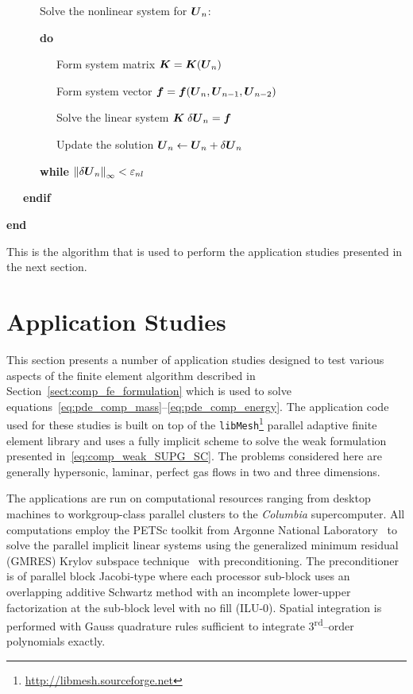 \begin{algorithm}[!htb]
\begin{minipage}{.95\textwidth}
\begin{list}{:\ \ }{}
	\item \ \ \ \ \ \ Solve the nonlinear system for $\bv{U}_n$:
 	\item \ \ \ \ \ \ \textbf{do}
 	\item \ \ \ \ \ \ \ \ \ Form system matrix $\bt{K} = \bt{K}(\bv{U}_n)$
 	\item \ \ \ \ \ \ \ \ \ Form system vector $\bv{f}= \bv{f}(\bv{U}_n,\bv{U}_{n-1},\bv{U}_{n-2})$
 	\item \ \ \ \ \ \ \ \ \ Solve the linear system $\bt{K} \; \delta\bv{U}_n = \bv{f}$
	\item \ \ \ \ \ \ \ \ \ Update the solution $\bv{U}_n \leftarrow \bv{U}_n + \delta\bv{U}_n$
 	\item \ \ \ \ \ \ \textbf{while} $\norm[\infty]{\delta\bv{U}_n} < \varepsilon_{nl}$
        \item \ \ \ \textbf{endif}
        \item \textbf{end} \\
    \end{list}
  \end{minipage}
\end{algorithm}
This is the algorithm that is used to perform the application studies presented in the next section.

\clearpage
\section{Application Studies\label{chap:compressible:applications}}
This section presents a number of application studies designed to test various aspects of the finite element algorithm described in Section~\ref{sect:comp_fe_formulation} which is used to solve equations~\eqref{eq:pde_comp_mass}--\eqref{eq:pde_comp_energy}.  The application code used for these studies is built on top of the \texttt{libMesh}\footnote{\url{http://libmesh.sourceforge.net}} parallel adaptive finite element library and uses a fully implicit scheme to solve the weak formulation presented in~\eqref{eq:comp_weak_SUPG_SC}.  The problems considered here are generally hypersonic, laminar, perfect gas flows in two and three dimensions.

The applications are run on computational resources ranging from desktop machines to workgroup-class parallel clusters to the \emph{Columbia} supercomputer.  All computations employ the PETSc toolkit from Argonne National Laboratory~\cite{petsc_manual} to solve the parallel implicit linear systems using the generalized minimum residual (GMRES) Krylov subspace technique~\cite{saad_schultz_gmres} with preconditioning.  The preconditioner is of parallel block Jacobi-type where each processor sub-block uses an overlapping additive Schwartz method with an incomplete lower-upper factorization at the sub-block level with no fill (ILU-0).  Spatial integration is performed with Gauss quadrature rules sufficient to integrate 3\textsuperscript{rd}--order polynomials exactly.

